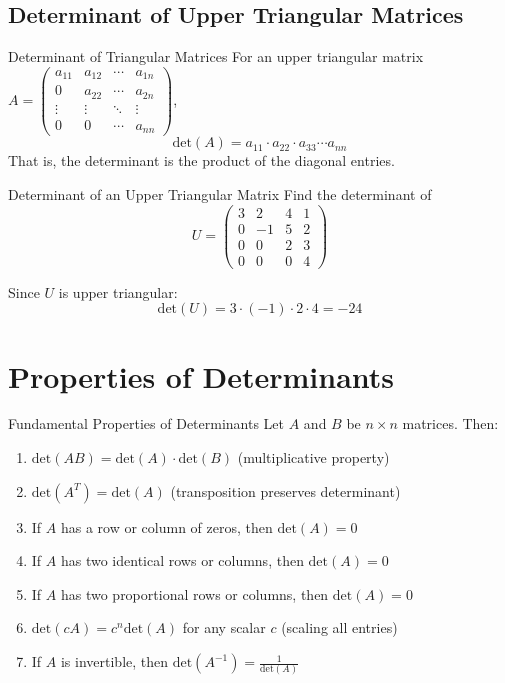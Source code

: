 \documentclass[12pt,a4paper]{article}
\newcommand{\Det}{\text{det}}
\begin{document}
	\subsection{Determinant of Upper Triangular Matrices}
	
	\begin{proposition}{Determinant of Triangular Matrices}
		For an upper triangular matrix $A = \begin{pmatrix} 
			a_{11} & a_{12} & \cdots & a_{1n} \\
			0 & a_{22} & \cdots & a_{2n} \\
			\vdots & \vdots & \ddots & \vdots \\
			0 & 0 & \cdots & a_{nn}
		\end{pmatrix}$,
		\[
		\Det(A) = a_{11} \cdot a_{22} \cdot a_{33} \cdots a_{nn}
		\]
		That is, the determinant is the product of the diagonal entries.
	\end{proposition}
	
	\begin{example}{Determinant of an Upper Triangular Matrix}
		Find the determinant of 
		\[
		U = \begin{pmatrix}
			3 & 2 & 4 & 1 \\
			0 & -1 & 5 & 2 \\
			0 & 0 & 2 & 3 \\
			0 & 0 & 0 & 4
		\end{pmatrix}
		\]
		
		Since $U$ is upper triangular:
		\[
		\Det(U) = 3 \cdot (-1) \cdot 2 \cdot 4 = -24
		\]
	\end{example}
	
	\section{Properties of Determinants}
	
	\begin{theorem}{Fundamental Properties of Determinants}
		Let $A$ and $B$ be $n \times n$ matrices. Then:
		\begin{enumerate}[label=(\roman*)]
			\item $\Det(AB) = \Det(A) \cdot \Det(B)$ (multiplicative property)
			\item $\Det(A^T) = \Det(A)$ (transposition preserves determinant)
			\item If $A$ has a row or column of zeros, then $\Det(A) = 0$
			\item If $A$ has two identical rows or columns, then $\Det(A) = 0$
			\item If $A$ has two proportional rows or columns, then $\Det(A) = 0$
			\item $\Det(cA) = c^n \Det(A)$ for any scalar $c$ (scaling all entries)
			\item If $A$ is invertible, then $\Det(A^{-1}) = \frac{1}{\Det(A)}$
		\end{enumerate}
	\end{theorem}
	
\end{document}
